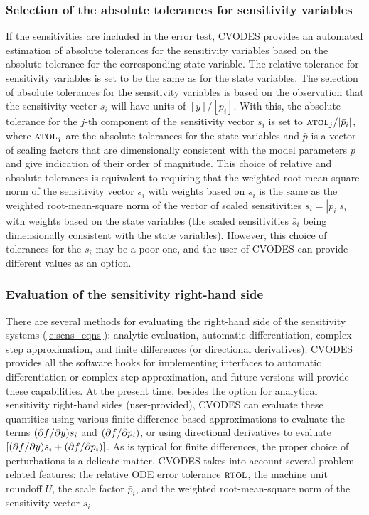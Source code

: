 \subsubsection{Selection of the absolute tolerances for sensitivity variables}
If the sensitivities are included in the error test, CVODES provides an 
automated estimation of absolute tolerances for the sensitivity variables 
based on the absolute tolerance for the corresponding state variable.
The relative tolerance for sensitivity variables is set to be the same as for 
the state variables. The selection of absolute tolerances for the sensitivity 
variables is based on the observation that the sensitivity vector $s_i$ will have 
units of $[y]/[p_i]$.
With this, the absolute tolerance for the $j$-th component of the sensitivity
vector $s_i$ is set to ${\mbox{\sc atol}_j}/{|{\bar p}_i|}$,
where $\mbox{\sc atol}_j$ are the absolute tolerances for the state variables and $\bar p$
is a vector of scaling factors that are dimensionally consistent with
the model parameters $p$ and give indication of their order of magnitude.
This choice of relative and absolute tolerances is equivalent 
to requiring that the weighted root-mean-square norm of the sensitivity 
vector $s_i$ with weights based on $s_i$ is the same as the
weighted root-mean-square norm of the vector of scaled sensitivities 
${\bar s}_i = |{\bar p}_i| s_i$ with weights based on the state variables
(the scaled sensitivities ${\bar s}_i$ being dimensionally consistent with the
state variables).
%
However, this choice of tolerances for the $s_i$ may be a poor one, and the user 
of CVODES can provide different values as an option.

\subsubsection{Evaluation of the sensitivity right-hand side}
There are several methods for evaluating the right-hand side of the sensitivity 
systems (\ref{e:sens_eqns}): analytic evaluation, automatic differentiation, 
complex-step approximation, and finite differences (or directional derivatives).
CVODES provides all the software hooks for implementing interfaces to
automatic differentiation or complex-step approximation, and future versions
will provide these capabilities.
At the present time, besides the option for analytical sensitivity right-hand 
sides (user-provided), CVODES can evaluate these quantities using various
finite difference-based approximations to evaluate the terms $(\partial f / \partial y) s_i$ 
and $(\partial f / \partial p_i)$, or using directional derivatives to evaluate
$\left[ (\partial f / \partial y) s_i + (\partial f / \partial p_i) \right]$.
As is typical for finite differences, the proper choice of perturbations is a 
delicate matter. CVODES takes into account several problem-related features:
the relative ODE error tolerance $\mbox{\sc rtol}$, the machine unit roundoff $U$,
the scale factor ${\bar p}_i$, and the weighted root-mean-square norm of the 
sensitivity vector $s_i$.

